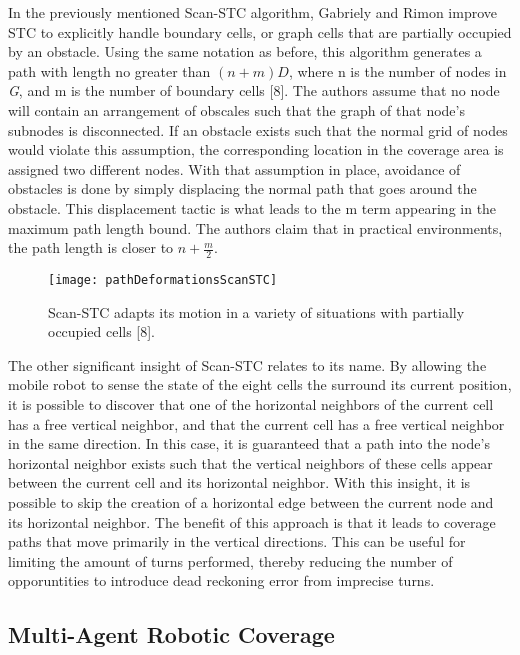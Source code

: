 In the previously mentioned Scan-STC algorithm, Gabriely and Rimon improve STC to explicitly handle boundary cells, or graph cells that are partially occupied by an obstacle. Using the same notation as before, this algorithm generates a path with length no greater than $ (n + m)\textit{D} $, where n is the number of nodes in \textit{G}, and m is the number of boundary cells [8]. The authors assume that no node will contain an arrangement of obscales such that the graph of that node's subnodes is disconnected. If an obstacle exists such that the normal grid of nodes would violate this assumption, the corresponding location in the coverage area is assigned two different nodes. With that assumption in place, avoidance of obstacles is done by simply displacing the normal path that goes around the obstacle. This displacement tactic is what leads to the m term appearing in the maximum path length bound. The authors claim that in practical environments, the path length is closer to $ n + \frac{m}{2} $. 

\begin{figure}[H]
\texttt{[image: pathDeformationsScanSTC]}
\caption[Path Deformations in Scan-STC]{Scan-STC adapts its motion in a variety of situations with partially occupied cells [8].}
\end{figure}


The other significant insight of Scan-STC relates to its name. By allowing the mobile robot to sense the state of the eight cells the surround its current position, it is possible to discover that one of the horizontal neighbors of the current cell has a free vertical neighbor, and that the current cell has a free vertical neighbor in the same direction. In this case, it is guaranteed that a path into the node's horizontal neighbor exists such that the vertical neighbors of these cells appear between the current cell and its horizontal neighbor. With this insight, it is possible to skip the creation of a horizontal edge between the current node and its horizontal neighbor. The benefit of this approach is that it leads to coverage paths that move primarily in the vertical directions. This can be useful for limiting the amount of turns performed, thereby reducing the number of opporuntities to introduce dead reckoning error from imprecise turns.

\subsection{Multi-Agent Robotic Coverage}

